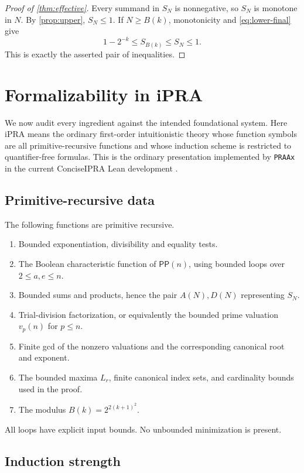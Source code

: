 \documentclass[11pt]{article}
\theoremstyle{definition}
\newcommand{\PP}{\mathsf{PP}}
\begin{document}
\begin{proof}[Proof of \cref{thm:effective}]
Every summand in $S_N$ is nonnegative, so $S_N$ is monotone in $N$.
By \cref{prop:upper}, $S_N\le1$.  If $N\ge B(k)$, monotonicity and
\eqref{eq:lower-final} give
\[
  1-2^{-k}\le S_{B(k)}\le S_N\le1.
\]
This is exactly the asserted pair of inequalities.
\end{proof}

\section{Formalizability in iPRA}

We now audit every ingredient against the intended foundational system.  Here
iPRA means the ordinary first-order intuitionistic theory whose function
symbols are all primitive-recursive functions and whose induction scheme is
restricted to quantifier-free formulas.  This is the ordinary presentation
implemented by \texttt{PRAAx} in the current ConciseIPRA Lean development
\cite{proveit-pr}.

\subsection{Primitive-recursive data}

The following functions are primitive recursive.
\begin{enumerate}[label=(\arabic*)]
\item Bounded exponentiation, divisibility and equality tests.
\item The Boolean characteristic function of $\PP(n)$, using bounded loops
      over $2\le a,e\le n$.
\item Bounded sums and products, hence the pair $A(N),D(N)$ representing
      $S_N$.
\item Trial-division factorization, or equivalently the bounded prime
      valuation $v_p(n)$ for $p\le n$.
\item Finite gcd of the nonzero valuations and the corresponding canonical
      root and exponent.
\item The bounded maxima $L_r$, finite canonical index sets, and cardinality
      bounds used in the proof.
\item The modulus $B(k)=2^{2(k+1)^2}$.
\end{enumerate}
All loops have explicit input bounds.  No unbounded minimization is present.

\subsection{Induction strength}
\end{document}
